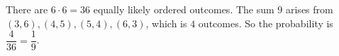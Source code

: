 There are $6\cdot6=36$ equally likely ordered outcomes. The sum $9$ arises from $(3,6),(4,5),(5,4),(6,3)$, which is $4$ outcomes. So the probability is $\dfrac{4}{36}=\boxed{\dfrac{1}{9}}$.
